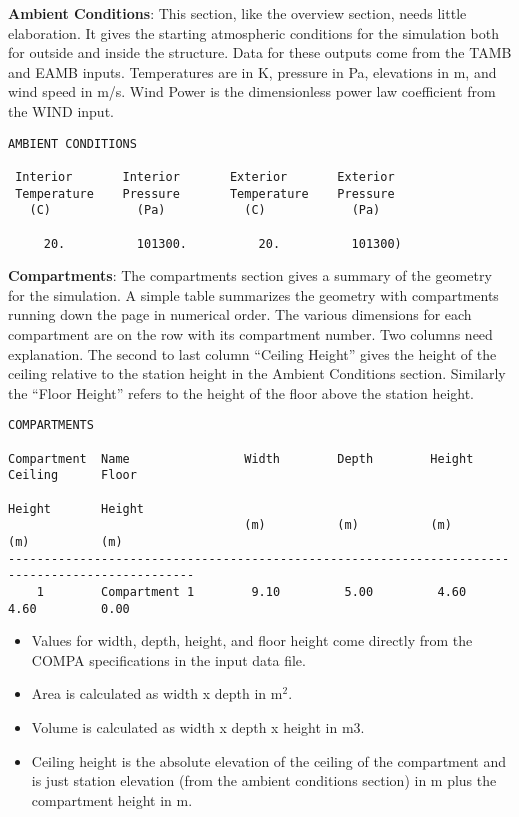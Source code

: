 \textbf{Ambient Conditions}: This section, like the overview section, needs little elaboration.  It gives the starting atmospheric conditions for the simulation both for outside and inside the structure. Data for these outputs come from the TAMB and EAMB inputs. Temperatures are in K, pressure in Pa, elevations in m, and wind speed in m/s. Wind Power is the dimensionless power law coefficient from the WIND input.

\begin{lstlisting}[basicstyle=\tiny]
 AMBIENT CONDITIONS

 Interior       Interior       Exterior       Exterior
 Temperature    Pressure       Temperature    Pressure
   (C)            (Pa)           (C)            (Pa)

     20.          101300.          20.          101300)
\end{lstlisting}

\textbf{Compartments}: The compartments section gives a summary of the geometry for the simulation.  A simple table summarizes the geometry with compartments running down the page in numerical order.  The various dimensions for each compartment are on the row with its compartment number.  Two columns need explanation.  The second to last column ``Ceiling Height'' gives the height of the ceiling relative to the station height in the Ambient Conditions section.  Similarly the ``Floor Height'' refers to the height of the floor above the station height.

\begin{lstlisting}[basicstyle=\tiny]
COMPARTMENTS

Compartment  Name                Width        Depth        Height       Ceiling      Floor
                                                                        Height       Height
                                 (m)          (m)          (m)          (m)          (m)
------------------------------------------------------------------------------------------------
    1        Compartment 1        9.10         5.00         4.60         4.60         0.00
\end{lstlisting}

\begin{itemize}
\item Values for width, depth, height, and floor height come directly from the COMPA specifications in the input data file.
\item Area is calculated as width x depth in m$^2$.
\item Volume is calculated as width x depth x height in m3.
\item Ceiling height is the absolute elevation of the ceiling of the compartment and is just station elevation (from the ambient conditions section) in m plus the compartment height in m.
\end{itemize}

